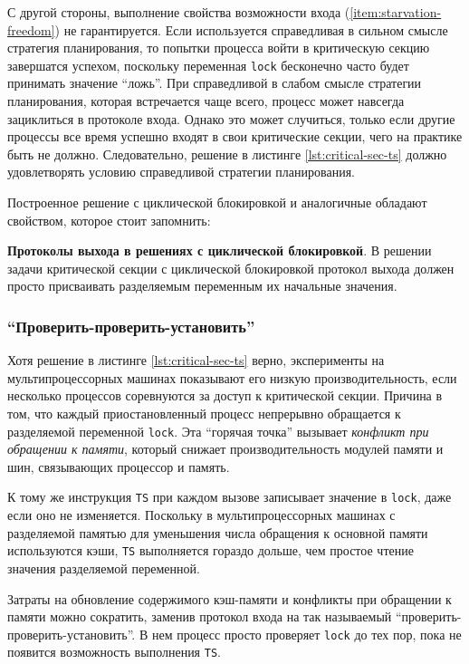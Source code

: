 С другой стороны, выполнение свойства возможности входа
(\ref{item:starvation-freedom}) не гарантируется. Если используется справедливая
в сильном смысле стратегия планирования, то попытки процесса войти в критическую
секцию завершатся успехом, поскольку переменная \texttt{lock} бесконечно часто
будет принимать значение ``ложь''. При справедливой в слабом смысле стратегии
планирования, которая встречается чаще всего, процесс может навсегда зациклиться
в протоколе входа. Однако это может случиться, только если другие процессы все
время успешно входят в свои критические секции, чего на практике быть не
должно. Следовательно, решение в листинге \ref{lst:critical-sec-ts} должно
удовлетворять условию справедливой стратегии планирования.

Построенное решение с циклической блокировкой и аналогичные обладают свойством,
которое стоит запомнить:

\textbf{Протоколы выхода в решениях с циклической блокировкой}. В решении задачи
критической секции с циклической блокировкой протокол выхода должен просто
присваивать разделяемым переменным их начальные значения.



\subsubsection{``Проверить-проверить-установить''}

Хотя решение в листинге \ref{lst:critical-sec-ts} верно, эксперименты на
мультипроцессорных машинах показывают его низкую производительность, если
несколько процессов соревнуются за доступ к критической секции. Причина в том,
что каждый приостановленный процесс непрерывно обращается к разделяемой
переменной \texttt{lock}. Эта ``горячая точка'' вызывает \emph{конфликт при
обращении к памяти}, который снижает производительность модулей памяти и шин,
связывающих процессор и память.

К тому же инструкция \texttt{TS} при каждом вызове записывает значение в
\texttt{lock}, даже если оно не изменяется. Поскольку в мультипроцессорных
машинах с разделяемой памятью для уменьшения числа обращения к основной памяти
используются кэши, \texttt{TS} выполняется гораздо дольше, чем простое чтение
значения разделяемой переменной.

Затраты на обновление содержимого кэш-памяти и конфликты при обращении к памяти
можно сократить, заменив протокол входа на так называемый
``проверить-проверить-установить''. В нем процесс просто проверяет \texttt{lock}
до тех пор, пока не появится возможность выполнения \texttt{TS}.


